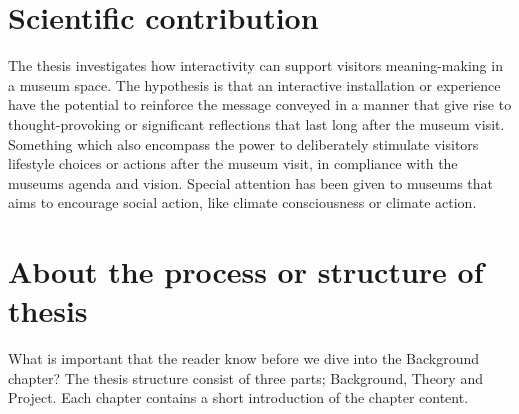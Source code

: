 \section{Scientific contribution}
The thesis investigates how interactivity can support visitors meaning-making in a museum space. The hypothesis is that an interactive installation or experience have the potential to reinforce the message conveyed in a manner that give rise to thought-provoking or significant reflections that last long after the museum visit. Something which also encompass the power to deliberately stimulate visitors lifestyle choices or actions after the museum visit, in compliance with the museums agenda and vision. Special attention has been given to museums that aims to encourage social action, like climate consciousness or climate action.

\section{About the process or structure of thesis}

What is important that the reader know before we dive into the Background chapter?
The thesis structure consist of three parts; Background, Theory and Project. Each chapter contains a short introduction of the chapter content.
